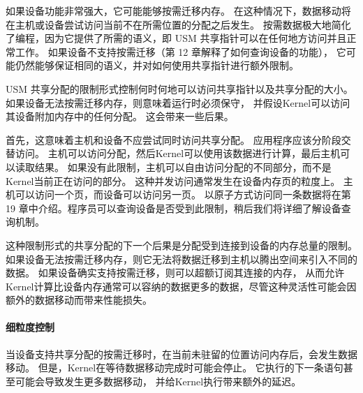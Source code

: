 如果设备功能非常强大，它可能能够按需迁移内存。 
在这种情况下，数据移动将在主机或设备尝试访问当前不在所需位置的分配之后发生。 
按需数据极大地简化了编程，因为它提供了所需的语义，即 USM 共享指针可以在任何地方访问并且正常工作。 
如果设备不支持按需迁移（第 12 章解释了如何查询设备的功能），
它可能仍然能够保证相同的语义，并对如何使用共享指针进行额外限制。

USM 共享分配的限制形式控制何时何地可以访问共享指针以及共享分配的大小。 
如果设备无法按需迁移内存，则意味着运行时必须保守，
并假设Kernel可以访问其设备附加内存中的任何分配。 这会带来一些后果。

首先，这意味着主机和设备不应尝试同时访问共享分配。 应用程序应该分阶段交替访问。 
主机可以访问分配，然后Kernel可以使用该数据进行计算，最后主机可以读取结果。 
如果没有此限制，主机可以自由访问分配的不同部分，而不是Kernel当前正在访问的部分。 
这种并发访问通常发生在设备内存页的粒度上。 主机可以访问一个页，而设备可以访问另一页。 
以原子方式访问同一条数据将在第 19 章中介绍。程序员可以查询设备是否受到此限制，稍后我们将详细了解设备查询机制。

这种限制形式的共享分配的下一个后果是分配受到连接到设备的内存总量的限制。 
如果设备无法按需迁移内存，则它无法将数据迁移到主机以腾出空间来引入不同的数据。 
如果设备确实支持按需迁移，则可以超额订阅其连接的内存，
从而允许Kernel计算比设备内存通常可以容纳的数据更多的数据，尽管这种灵活性可能会因额外的数据移动而带来性能损失。

\paragraph{细粒度控制}

当设备支持共享分配的按需迁移时，在当前未驻留的位置访问内存后，会发生数据移动。 
但是，Kernel在等待数据移动完成时可能会停止。 它执行的下一条语句甚至可能会导致发生更多数据移动，
并给Kernel执行带来额外的延迟。

